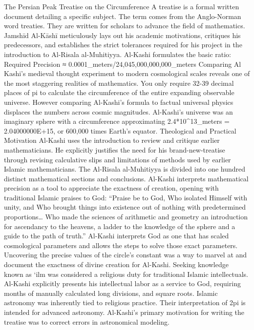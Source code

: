 {The Persian Peak
Treatise on the Circumference
A treatise is a formal written document detailing a specific subject. The term comes from the Anglo-Norman word treaties. They are written for scholars to advance the field of mathematics. Jamshīd Al-Kāshī meticulously lays out his academic motivations, critiques his predecessors, and establishes the strict tolerances required for his project in the introduction to Al-Risala al-Muhitiyya. Al-Kashi formulates the basic ratio: 
Required Precision ≈ 0.0001_meters/24,045,000,000,000_meters
Comparing Al Kashi’s medieval thought experiment to modern cosmological scales reveals one of the most staggering realities of mathematics. You only require 32-39 decimal places of pi to calculate the circumference of the entire expanding observable universe. However comparing Al-Kashi’s formula to factual universal physics displaces the numbers across cosmic magnitudes. Al-Kashi’s universe was an imaginary sphere with a circumference approximating 2.4*10^13_meters = 2.04000000E+15, or 600,000 times Earth’s equator. 
Theological and Practical Motivation
Al-Kashi uses the introduction to review and critique earlier mathematicians. He explicitly justifies the need for his brand-new-treatise through revising calculative slips and limitations of methods used by earlier Islamic mathematicians. The Al-Risala al-Muhitiyya is divided into one hundred distinct mathematical sections and conclusions. Al-Kashi interprets mathematical precision as a tool to appreciate the exactness of creation, opening with traditional Islamic praises to God:
“Praise be to God, Who isolated Himself with unity, and Who brought things into existence out of nothing with predetermined proportions… Who made the sciences of arithmetic and geometry an introduction for ascendancy to the heavens, a ladder to the knowledge of the sphere and a guide to the path of truth.”
Al-Kashi interprets God as one that has scaled cosmological parameters and allows the steps to solve those exact parameters. Uncovering the precise values of the circle’s constant was a way to marvel at and document the exactness of divine creation for Al-Kashi. Seeking knowledge known as ‘ilm was considered a religious duty for traditional Islamic intellectuals. Al-Kashi explicitly presents his intellectual labor as a service to God, requiring months of manually calculated long divisions, and square roots. Islamic astronomy was inherently tied to religious practice. Their interpretation of 2pi is intended for advanced astronomy. Al-Kashi’s primary motivation for writing the treatise was to correct errors in astronomical modeling. 
}
